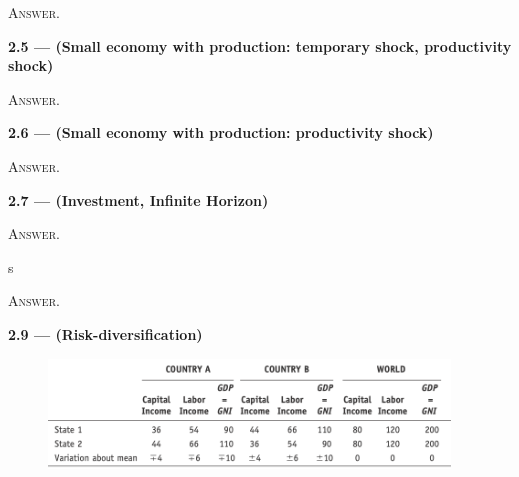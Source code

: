 \documentclass[11pt, a4paper]{article}
\begin{document}
\dotfill

\textsc{Answer.}

\clearpage
\textbf{2.5 — (Small economy with production: temporary shock, productivity shock)}

\dotfill

\textsc{Answer.}

\clearpage
\textbf{2.6 — (Small economy with production: productivity shock)}


\dotfill

\textsc{Answer.}

\clearpage
\textbf{2.7 — (Investment, Infinite Horizon)}

\dotfill

\textsc{Answer.}

\clearpage
s

\textsc{Answer.}

\clearpage
\textbf{2.9 — (Risk-diversification)}

\begin{figure}[!htb]
	\centering
	\includegraphics[width=0.95\textwidth]{img/ps02_risk-diversification.png}
	\label{}
\end{figure}
\end{document}
